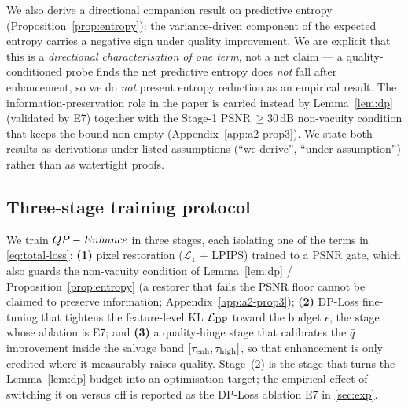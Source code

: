We also derive a directional companion result on predictive entropy (Proposition~\ref{prop:entropy}):
the variance-driven component of the expected entropy carries a negative sign under quality improvement.
We are explicit that this is a \emph{directional characterisation of one term}, not a net claim --- a
quality-conditioned probe finds the net predictive entropy does \emph{not} fall after enhancement, so we
do \emph{not} present entropy reduction as an empirical result. The information-preservation role in the
paper is carried instead by Lemma~\ref{lem:dp} (validated by E7) together with the Stage-1
PSNR$\,\geq30$\,dB non-vacuity condition that keeps the bound non-empty
(Appendix~\ref{app:a2-prop3}). We state both results as derivations under listed assumptions
(``we derive'', ``under assumption'') rather than as watertight proofs.



\subsection{Three-stage training protocol}\label{sec:training}
We train $QP-Enhance$ in three stages, each isolating one of the terms in \eqref{eq:total-loss}:
\textbf{(1)} pixel restoration ($\mathcal{L}_1$ + LPIPS) trained to a PSNR gate, which also guards the
non-vacuity condition of Lemma~\ref{lem:dp} / Proposition~\ref{prop:entropy} (a restorer that fails the
PSNR floor cannot be claimed to preserve information; Appendix~\ref{app:a2-prop3});
\textbf{(2)} DP-Loss fine-tuning that tightens the feature-level KL $\mathcal{L}_{\mathrm{DP}}$ toward the budget $\epsilon$,
the stage whose ablation is E7; and
\textbf{(3)} a quality-hinge stage that calibrates the $\bar{q}$ improvement inside the salvage band
$[\tau_{\mathrm{enh}},\tau_{\mathrm{high}}]$, so that enhancement is only credited where it measurably raises quality.
Stage~(2) is the stage that turns the Lemma~\ref{lem:dp} budget into an optimisation target; the
empirical effect of switching it on versus off is reported as the DP-Loss ablation E7 in
\cref{sec:exp}.
